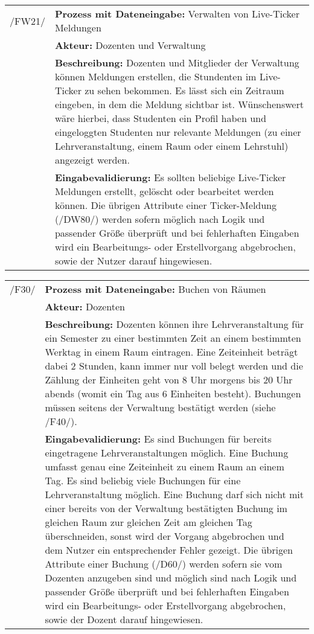 \begin{tabular}{p{1.5cm}p{14.5cm}}
	
	 /FW21/& \textbf{Prozess mit Dateneingabe:} Verwalten von Live-Ticker Meldungen \\
				& \textbf{Akteur:} Dozenten und Verwaltung \\
				& \textbf{Beschreibung:} Dozenten und Mitglieder der Verwaltung können Meldungen erstellen, die Stundenten im Live-Ticker zu sehen bekommen. Es lässt sich ein Zeitraum eingeben, in dem die Meldung sichtbar ist. Wünschenswert wäre hierbei, dass Studenten ein Profil haben und eingeloggten Studenten nur relevante Meldungen (zu einer Lehrveranstaltung, einem Raum oder einem Lehrstuhl) angezeigt werden. \\
				& \textbf{Eingabevalidierung:} Es sollten beliebige Live-Ticker Meldungen erstellt, gelöscht oder bearbeitet werden können. Die übrigen Attribute einer Ticker-Meldung (/DW80/) werden sofern möglich nach Logik und passender Größe überprüft und bei fehlerhaften Eingaben wird ein Bearbeitungs- oder Erstellvorgang abgebrochen, sowie der Nutzer darauf hingewiesen.\\[0.25cm]

\end{tabular}


\begin{tabular}{p{1.5cm}p{14.5cm}}
		
	 /F30/	& \textbf{Prozess mit Dateneingabe:} Buchen von Räumen \\
				& \textbf{Akteur:} Dozenten \\
				& \textbf{Beschreibung:} Dozenten können ihre Lehrveranstaltung für ein Semester zu einer bestimmten Zeit an einem bestimmten Werktag in einem Raum eintragen. Eine Zeiteinheit beträgt dabei 2 Stunden, kann immer nur voll belegt werden und die Zählung der Einheiten geht von 8 Uhr morgens bis 20 Uhr abends (womit ein Tag aus 6 Einheiten besteht). Buchungen müssen seitens der Verwaltung bestätigt werden (siehe /F40/). \\
				& \textbf{Eingabevalidierung:} Es sind Buchungen für bereits eingetragene Lehrveranstaltungen möglich. Eine Buchung umfasst genau eine Zeiteinheit zu einem Raum an einem Tag. Es sind beliebig viele Buchungen für eine Lehrveranstaltung möglich. Eine Buchung darf sich nicht mit einer bereits von der Verwaltung bestätigten Buchung im gleichen Raum zur gleichen Zeit am gleichen Tag überschneiden, sonst wird der Vorgang abgebrochen und dem Nutzer ein entsprechender Fehler gezeigt. Die übrigen Attribute einer Buchung (/D60/) werden sofern sie vom Dozenten anzugeben sind und möglich sind nach Logik und passender Größe überprüft und bei fehlerhaften Eingaben wird ein Bearbeitungs- oder Erstellvorgang abgebrochen, sowie der Dozent darauf hingewiesen.\\[0.25cm]

\end{tabular}


